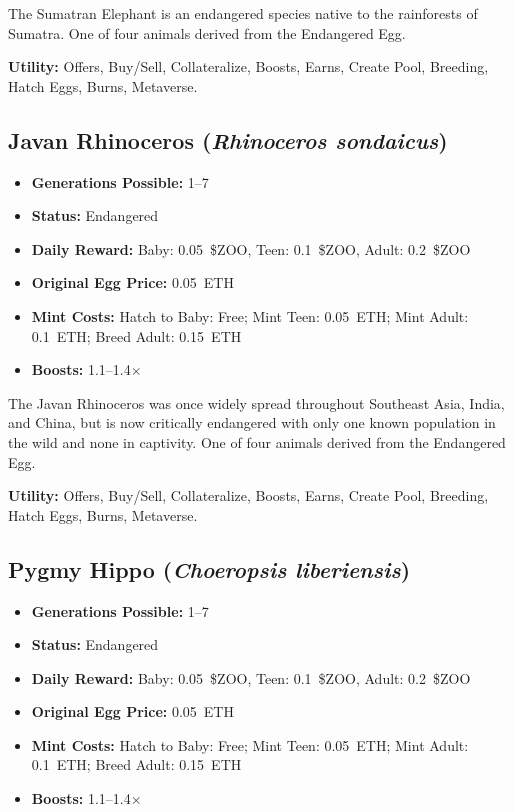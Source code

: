 The Sumatran Elephant is an endangered species native to the rainforests of Sumatra. One of four animals derived from the Endangered Egg.

\textbf{Utility:} Offers, Buy/Sell, Collateralize, Boosts, Earns, Create Pool, Breeding, Hatch Eggs, Burns, Metaverse.

\subsection{Javan Rhinoceros (\textit{Rhinoceros sondaicus})}

\begin{itemize}[nosep]
\item \textbf{Generations Possible:} 1--7
\item \textbf{Status:} Endangered
\item \textbf{Daily Reward:} Baby: 0.05~\$ZOO, Teen: 0.1~\$ZOO, Adult: 0.2~\$ZOO
\item \textbf{Original Egg Price:} 0.05~ETH
\item \textbf{Mint Costs:} Hatch to Baby: Free; Mint Teen: 0.05~ETH; Mint Adult: 0.1~ETH; Breed Adult: 0.15~ETH
\item \textbf{Boosts:} 1.1--1.4$\times$
\end{itemize}

The Javan Rhinoceros was once widely spread throughout Southeast Asia, India, and China, but is now critically endangered with only one known population in the wild and none in captivity. One of four animals derived from the Endangered Egg.

\textbf{Utility:} Offers, Buy/Sell, Collateralize, Boosts, Earns, Create Pool, Breeding, Hatch Eggs, Burns, Metaverse.

\subsection{Pygmy Hippo (\textit{Choeropsis liberiensis})}

\begin{itemize}[nosep]
\item \textbf{Generations Possible:} 1--7
\item \textbf{Status:} Endangered
\item \textbf{Daily Reward:} Baby: 0.05~\$ZOO, Teen: 0.1~\$ZOO, Adult: 0.2~\$ZOO
\item \textbf{Original Egg Price:} 0.05~ETH
\item \textbf{Mint Costs:} Hatch to Baby: Free; Mint Teen: 0.05~ETH; Mint Adult: 0.1~ETH; Breed Adult: 0.15~ETH
\item \textbf{Boosts:} 1.1--1.4$\times$
\end{itemize}

